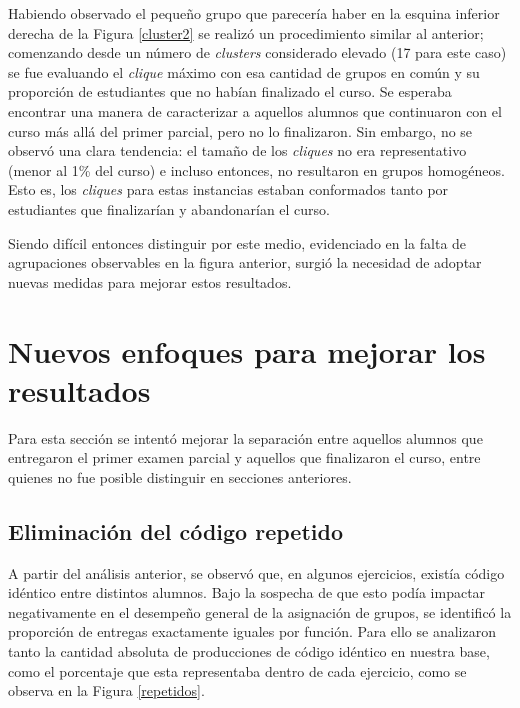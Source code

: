 \documentclass[11pt,a4paper,twoside,openany]{tesis}
\begin{document}
Habiendo observado el pequeño grupo que parecería haber en la esquina inferior derecha de la Figura \ref {cluster2} se realizó un procedimiento similar al anterior; comenzando desde un número de \emph{clusters} considerado elevado (17 para este caso) se fue evaluando el \emph{clique} máximo con esa cantidad de grupos en común y su proporción de estudiantes que no habían finalizado el curso. Se esperaba encontrar una manera de caracterizar a aquellos alumnos que continuaron con el curso más allá del primer parcial, pero no lo finalizaron. Sin embargo, no se observó una clara tendencia: el tamaño de los \emph{cliques} no era representativo (menor al 1\% del curso) e incluso entonces, no resultaron en grupos homogéneos. Esto es, los \emph{cliques} para estas instancias estaban conformados tanto por estudiantes que finalizarían y abandonarían el curso.

Siendo difícil entonces distinguir por este medio, evidenciado en la falta de agrupaciones observables en la figura anterior, surgió la necesidad de adoptar nuevas medidas para mejorar estos resultados. 

\section{Nuevos enfoques para mejorar los resultados}

Para esta sección se intentó mejorar la separación entre aquellos alumnos que entregaron el primer examen parcial y aquellos que finalizaron el curso, entre quienes no fue posible distinguir en secciones anteriores. 

\subsection{Eliminación del código repetido}

A partir del análisis anterior, se observó que, en algunos ejercicios, existía código idéntico entre distintos alumnos. Bajo la sospecha de que esto podía impactar negativamente en el desempeño general de la asignación de grupos, se identificó la proporción de entregas exactamente iguales por función. Para ello se analizaron tanto la cantidad absoluta de producciones de código idéntico en nuestra base, como el porcentaje que esta representaba dentro de cada ejercicio, como se observa en la Figura \ref{repetidos}. 
\end{document}
